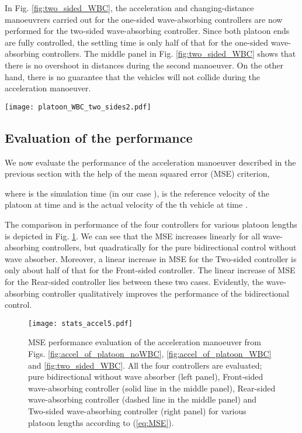 \documentclass[final,5p,times,twocolumn]{elsarticle}
\begin{document}
In Fig. \ref{fig:two_sided_WBC}, the acceleration and changing-distance manoeuvrers carried out for the one-sided wave-absorbing controllers are now performed for the two-sided wave-absorbing controller. Since both platoon ends are fully controlled, the settling time is only half of that for the one-sided wave-absorbing controllers. The middle panel in Fig. \ref{fig:two_sided_WBC} shows that there is no overshoot in distances during the second manoeuver. On the other hand, there is no guarantee that the vehicles will not collide during the acceleration manoeuver.

\begin{figure*}[!htbp]
 \centering
  \texttt{[image: platoon\_WBC\_two\_sides2.pdf]}
    \caption{As in Fig. \ref{fig:accel_of_platoon_WBC} but with the Two-sided wave-absorbing controller. The second command to increase  comes at .}
  \label{fig:two_sided_WBC}
\end{figure*}

\subsection{Evaluation of the performance}
We now evaluate the performance of the acceleration manoeuver described in the previous section with the help of the mean squared error (MSE) criterion,

where  is the simulation time (in our case ),  is the reference velocity of the platoon at time  and  is the actual velocity of the th vehicle at time .

The comparison in performance of the four controllers for various platoon lengths is depicted in Fig. \ref{fig:stats_accel}. We can see that the MSE increases linearly for all wave-absorbing controllers, but quadratically for the pure bidirectional control without wave absorber. Moreover, a linear increase in MSE for the Two-sided controller is only about half of that for the Front-sided controller. The linear increase of MSE for the Rear-sided controller lies between these two cases. Evidently, the wave-absorbing controller qualitatively improves the performance of the bidirectional control.
\begin{figure}[ht]
 \centering
  \texttt{[image: stats\_accel5.pdf]}
  \caption{MSE performance evaluation of the acceleration manoeuver from Figs. \ref{fig:accel_of_platoon_noWBC}, \ref{fig:accel_of_platoon_WBC} and \ref{fig:two_sided_WBC}. All the four controllers are evaluated; pure bidirectional without wave absorber (left panel), Front-sided wave-absorbing controller (solid line in the middle panel), Rear-sided wave-absorbing controller (dashed line in the middle panel) and Two-sided wave-absorbing controller (right panel) for various platoon lengths according to (\ref{eq:MSE}).}
  \label{fig:stats_accel}
\end{figure}
\end{document}
